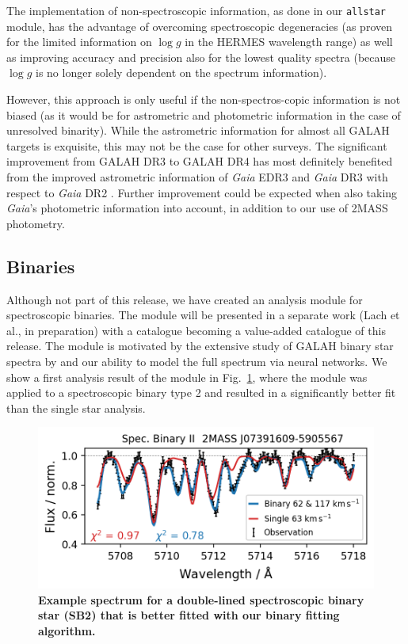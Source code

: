 \documentclass[
  journal=pasa,
  manuscript=research-paper, %
  year=2024,
  volume=37
]{cup-journal}
\newcommand{\logg}{$\log g$\xspace}
\begin{document}
The implementation of non-spectroscopic information, as done in our \texttt{allstar} module, has the advantage of overcoming spectroscopic degeneracies (as proven for the limited information on \logg in the HERMES wavelength range) as well as improving accuracy and precision also for the lowest quality spectra (because \logg is no longer solely dependent on the spectrum information).

However, this approach is only useful if the non-spectros-copic information is not biased (as it would be for astrometric and photometric information in the case of unresolved binarity). While the astrometric information for almost all GALAH targets is exquisite, this may not be the case for other surveys. The significant improvement from GALAH DR3 to GALAH DR4 has most definitely benefited from the improved astrometric information of \textit{Gaia} EDR3 \citep{GaiaEDR3, Lindegren2021a} and \textit{Gaia} DR3 \citep{GaiaDR3} with respect to \textit{Gaia} DR2 \citep{Brown2018, Lindegren2018}. Further improvement could be expected when also taking \textit{Gaia}'s photometric information into account, in addition to our use of 2MASS photometry.

\subsection{Binaries} \label{sec:caveats_binaries}

Although not part of this release, we have created an analysis module for spectroscopic binaries. The module will be presented in a separate work (Lach et al., in preparation) with a catalogue becoming a value-added catalogue of this release. The module is motivated by the extensive study of GALAH binary star spectra by \citet{Traven2020} and our ability to model the full spectrum via neural networks. We show a first analysis result of the module in Fig.~\ref{fig:examples_flag_sp_3}, where the module was applied to a spectroscopic binary type 2 and resulted in a significantly better fit than the single star analysis.

\begin{figure}[ht]
 \centering
 \includegraphics[width=\textwidth]{figures/examples_flag_sp_3.png}
 \caption{\textbf{Example spectrum for a double-lined spectroscopic binary star (SB2) that is better fitted with our binary fitting algorithm.}} \label{fig:examples_flag_sp_3}
\end{figure}
\end{document}
